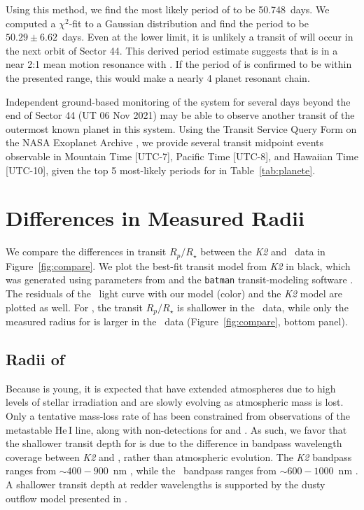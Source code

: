 \documentclass[twocolumn]{aastex631}
\begin{document}
Using this method, we find the most likely period of \planete to be 50.748~days. We computed a $\chi^2$-fit to a Gaussian distribution and find the period to be $50.29 \pm 6.62$~days. Even at the lower limit, it is unlikely a transit of \planete will occur in the next orbit of Sector 44. This derived period estimate suggests that \planete is in a near 2:1 mean motion resonance with \planetb. If the period of \planete is confirmed to be within the presented range, this would make \allplanets a nearly 4 planet resonant chain.

Independent ground-based monitoring of the system for several days beyond the end of Sector 44 (UT 06 Nov 2021) may be able to observe another transit of the outermost known planet in this system. Using the Transit Service Query Form on the NASA Exoplanet Archive \citep{Akeson2013}, we provide several transit midpoint events observable in Mountain Time [UTC-7], Pacific Time [UTC-8], and Hawaiian Time [UTC-10], given the top 5 most-likely periods for \planete in Table~\ref{tab:planete}.

\section{Differences in Measured Radii} \label{sec:radii}

We compare the differences in transit $R_p/R_\star$ between the \textit{K2} and \tess\ data in Figure~\ref{fig:compare}. We plot the best-fit transit model from \textit{K2} in black, which was generated using parameters from \cite{David2019a} and the \texttt{batman} transit-modeling software \citep{Kreidberg15}. The residuals of the \tess\ light curve with our model (color) and the \textit{K2} model are plotted as well. For \planetknown, the transit $R_p/R_\star$ is shallower in the \tess\ data, while only the measured radius for \planete is larger in the \tess\ data (Figure~\ref{fig:compare}, bottom panel).

\subsection{Radii of \planetknown}

Because \sname is young, it is expected that \allplanets have extended atmospheres due to high levels of stellar irradiation \citep{OwenWu2017} and are slowly evolving as atmospheric mass is lost. Only a tentative mass-loss rate of \planetd has been constrained from observations of the metastable He\,\textsc{I} line, along with non-detections for \planetb and \planetc \citep{Vissapragada21}. As such, we favor that the shallower transit depth for \allplanets is due to the difference in bandpass wavelength coverage between \textit{K2} and \tess, rather than atmospheric evolution. The \textit{K2} bandpass ranges from $\sim 400-900$~nm \citep{Howell2014}, while the \tess\ bandpass ranges from $\sim 600-1000$~nm \citep{Ricker2015}. A shallower transit depth at redder wavelengths is supported by the dusty outflow model presented in \citep{wang19}.
\end{document}
